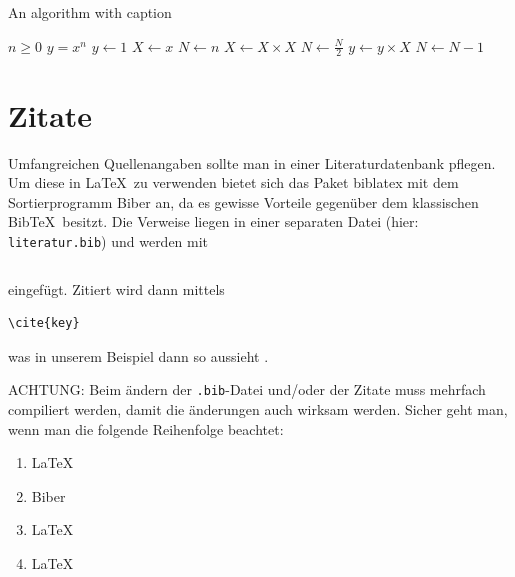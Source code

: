 \documentclass[12pt,DIV=15,BCOR=15mm,twoside,headsepline,abstract=true,listof=totoc,bibliography=totoc]{scrreprt}
\theoremstyle{remark}	%
\begin{document}


\begin{algorithm}
\caption{An algorithm with caption}\label{alg:cap}
\begin{algorithmic}
\Require $n \geq 0$
\Ensure $y = x^n$
\State $y \gets 1$
\State $X \gets x$
\State $N \gets n$
    \State $X \gets X \times X$
    \State $N \gets \frac{N}{2}$  
    \State $y \gets y \times X$
    \State $N \gets N - 1$
\EndIf
\EndWhile
\end{algorithmic}
\end{algorithm}

\section{Zitate}
\label{ch:bib}
Umfangreichen Quellenangaben sollte man in einer Literaturdatenbank pflegen. Um diese in \LaTeX\ zu verwenden bietet sich das Paket biblatex mit dem Sortierprogramm
 Biber an, da es gewisse Vorteile gegenüber dem klassischen Bib\TeX\ besitzt. 
Die Verweise liegen in einer separaten Datei (hier: \texttt{literatur.bib}) und werden mit \begin{verbatim}\end{verbatim} eingefügt. %
Zitiert wird dann mittels \begin{verbatim}\cite{key}\end{verbatim} was in unserem Beispiel dann so aussieht \cite{forster1983analysis}. 

\noindent ACHTUNG: Beim ändern der {\texttt{.bib}}-Datei und/oder der Zitate muss mehrfach compiliert werden, damit die änderungen auch wirksam werden. Sicher geht man, wenn man die folgende Reihenfolge beachtet: 
\begin{enumerate}
 \item \LaTeX
 \item Biber
 \item \LaTeX
 \item \LaTeX
\end{enumerate}
\end{document}
